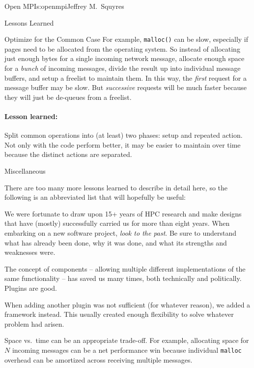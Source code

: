 \begin{aosachapter}{Open MPI}{s:openmpi}{Jeffrey M.\ Squyres}
\begin{aosasect1}{Lessons Learned}
\begin{aosasect2}{Optimize for the Common Case}
For example, {\tt malloc()} can be slow, especially if pages need to
be allocated from the operating system.  So instead of allocating just
enough bytes for a single incoming network message, allocate enough
space for a {\em bunch} of incoming messages, divide the result up
into individual message buffers, and setup a freelist to maintain
them.  In this way, the {\em first} request for a message buffer may
be slow.  But {\em successive} requests will be much faster because
they will just be de-queues from a freelist.


\paragraph{Lesson learned:} Split common operations into (at least)
two phases: setup and repeated action.  Not only with the code perform
better, it may be easier to maintain over time because the distinct
actions are separated.

\end{aosasect2}


\begin{aosasect2}{Miscellaneous}

There are too many more lessons learned to describe in detail here,
so the following is an abbreviated list that will hopefully be useful:

\begin{aosaitemize}
\item We were fortunate to draw upon 15+ years of HPC research and
  make designs that have (mostly) successfully carried us for more
  than eight years.  When embarking on a new software project, {\em
    look to the past}.  Be sure to understand what has already been
  done, why it was done, and what its strengths and weaknesses were.

\item The concept of components -- allowing multiple different
  implementations of the same functionality -- has saved us many
  times, both technically and politically.  Plugins are good.

\item When adding another plugin was not sufficient (for whatever
  reason), we added a framework instead.  This usually created enough
  flexibility to solve whatever problem had arisen.

\item Space vs.\ time can be an appropriate trade-off.  For example,
  allocating space for $N$ incoming messages can be a net performance
  win because individual {\tt malloc} overhead can be amortized across
  receiving multiple messages.


\end{aosaitemize}
\end{aosasect2}
\end{aosasect1}
\end{aosachapter}

